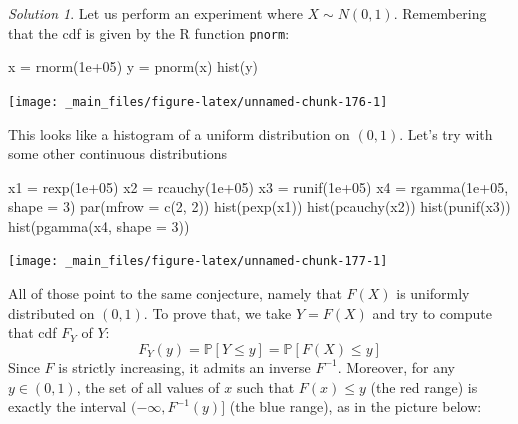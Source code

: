 \documentclass[
]{book}
\newenvironment{Shaded}{\begin{snugshade}}{\end{snugshade}}
\newcommand{\AttributeTok}[1]{\textcolor[rgb]{0.77,0.63,0.00}{#1}}
\newcommand{\DecValTok}[1]{\textcolor[rgb]{0.00,0.00,0.81}{#1}}
\newcommand{\FloatTok}[1]{\textcolor[rgb]{0.00,0.00,0.81}{#1}}
\newcommand{\FunctionTok}[1]{\textcolor[rgb]{0.00,0.00,0.00}{#1}}
\newcommand{\NormalTok}[1]{#1}
\newcommand{\OtherTok}[1]{\textcolor[rgb]{0.56,0.35,0.01}{#1}}
\theoremstyle{definition}
\theoremstyle{definition}
\theoremstyle{definition}
\theoremstyle{definition}
\theoremstyle{remark}
\newtheorem*{solution}{Solution}
\begin{document}
\begin{solution}
Let us perform an experiment where \(X \sim N(0,1)\). Remembering that the cdf is given by the R function \texttt{pnorm}:

\begin{Shaded}
\begin{Highlighting}[]
\NormalTok{x }\OtherTok{=} \FunctionTok{rnorm}\NormalTok{(}\FloatTok{1e+05}\NormalTok{)}
\NormalTok{y }\OtherTok{=} \FunctionTok{pnorm}\NormalTok{(x)}
\FunctionTok{hist}\NormalTok{(y)}
\end{Highlighting}
\end{Shaded}

\begin{center}\texttt{[image: \_main\_files/figure-latex/unnamed-chunk-176-1]} \end{center}

This looks like a histogram of a uniform distribution on \((0,1)\).
Let's try with some other continuous distributions

\begin{Shaded}
\begin{Highlighting}[]
\NormalTok{x1 }\OtherTok{=} \FunctionTok{rexp}\NormalTok{(}\FloatTok{1e+05}\NormalTok{)}
\NormalTok{x2 }\OtherTok{=} \FunctionTok{rcauchy}\NormalTok{(}\FloatTok{1e+05}\NormalTok{)}
\NormalTok{x3 }\OtherTok{=} \FunctionTok{runif}\NormalTok{(}\FloatTok{1e+05}\NormalTok{)}
\NormalTok{x4 }\OtherTok{=} \FunctionTok{rgamma}\NormalTok{(}\FloatTok{1e+05}\NormalTok{, }\AttributeTok{shape =} \DecValTok{3}\NormalTok{)}
\FunctionTok{par}\NormalTok{(}\AttributeTok{mfrow =} \FunctionTok{c}\NormalTok{(}\DecValTok{2}\NormalTok{, }\DecValTok{2}\NormalTok{))}
\FunctionTok{hist}\NormalTok{(}\FunctionTok{pexp}\NormalTok{(x1))}
\FunctionTok{hist}\NormalTok{(}\FunctionTok{pcauchy}\NormalTok{(x2))}
\FunctionTok{hist}\NormalTok{(}\FunctionTok{punif}\NormalTok{(x3))}
\FunctionTok{hist}\NormalTok{(}\FunctionTok{pgamma}\NormalTok{(x4, }\AttributeTok{shape =} \DecValTok{3}\NormalTok{))}
\end{Highlighting}
\end{Shaded}

\begin{center}\texttt{[image: \_main\_files/figure-latex/unnamed-chunk-177-1]} \end{center}

All of those point to the same conjecture, namely that \(F(X)\) is
uniformly distributed on \((0,1)\).
To prove that, we
take \(Y=F(X)\) and try to compute that cdf \(F_Y\) of \(Y\):
\[F_Y(y) = {\mathbb{P}}[ Y \leq y] = {\mathbb{P}}[ F(X) \leq y]\]
Since \(F\) is strictly increasing, it admits an inverse \(F^{-1}\).
Moreover, for any \(y \in (0,1)\),
the set of all values of \(x\) such that \(F(x)\leq y\) (the red range) is
exactly the interval \((-\infty, F^{-1}(y)]\) (the blue range), as in
the picture below:


\end{solution}
\end{document}
